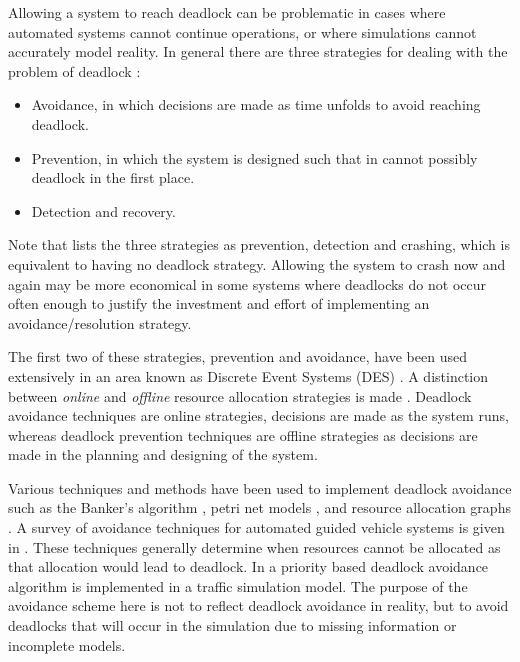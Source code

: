 \documentclass{article}
\numberwithin{equation}{section}
\begin{document}
Allowing a system to reach deadlock can be problematic in cases where
automated systems cannot continue operations, or where simulations cannot
accurately model reality.
In general there are three strategies for dealing with the problem of deadlock
\cite{kawadkaretal14, elmagarmid86, venkateshsmith05, vis06}:

\begin{itemize}
  \item Avoidance, in which decisions are made as time unfolds to avoid
  reaching deadlock.
  \item Prevention, in which the system is designed such that in cannot
  possibly deadlock in the first place.
  \item Detection and recovery.
\end{itemize}

Note that \cite{holt72} lists the three strategies as prevention, detection
and crashing, which is equivalent to having no deadlock strategy.
Allowing the system to crash now and again may be more economical in some
systems where deadlocks do not occur often enough to justify the investment
and effort of implementing an avoidance/resolution strategy.

The first two of these strategies, prevention and avoidance, have been used
extensively in an area known as Discrete Event Systems (DES)
\cite{reveliotis15a, reveliotis15b}.
A distinction between \textit{online} and \textit{offline} resource allocation
strategies is made \cite{venkateshsmith05}.
Deadlock avoidance techniques are online strategies, decisions are made as the
system runs, whereas deadlock prevention techniques are offline strategies as
decisions are made in the planning and designing of the system.

Various techniques and methods have been used to implement deadlock avoidance
such as the Banker's algorithm \cite{dijkstra82, kawadkaretal14}, petri net
models \cite{viswanadhametal90, ezpeletaetal02, marchettimunierkordon09}, and
resource allocation graphs \cite{belik90}.
A survey of avoidance techniques for automated guided vehicle systems is given
in \cite{vis06}.
These techniques generally determine when resources cannot be allocated as
that allocation would lead to deadlock.
In \cite{florianetal08} a priority based deadlock avoidance algorithm is
implemented in a traffic simulation model.
The purpose of the avoidance scheme here is not to reflect deadlock avoidance
in reality, but to avoid deadlocks that will occur in the simulation due to
missing information or incomplete models.
\end{document}

